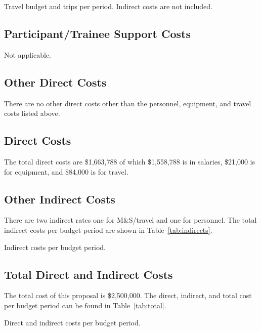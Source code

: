 \documentclass[letter, USenglish, 11pt, subfigure]{article}
\begin{document}
\begin{table}[!htpb]
  \begin{center}  
    \caption{Travel budget and trips per period. Indirect costs are not included.}
    \label{tab:yearlyTravelBudget}
  
  \end{center}
\end{table}

\subsection{Participant/Trainee Support Costs}
\label{subsec:trainee}
Not applicable.

\subsection{Other Direct Costs}
\label{subsec:otherDirects}
There are no other direct costs other than the personnel, equipment, and travel costs listed above.

\subsection{Direct Costs}
\label{subsec:directs}
The total direct costs are \$1,663,788 of which \$1,558,788 is in salaries, \$21,000 is for equipment, and \$84,000 is for travel.

\subsection{Other Indirect Costs}
\label{subsec:otherIndirects}
There are two indirect rates one for M\&S/travel and one for personnel. The total indirect costs per budget period are shown in Table~\ref{tab:indirects}.

\begin{table}[!htpb]
  \begin{center}  
    \caption{Indirect costs per budget period.}
      \label{tab:indirects}
  
  \end{center}
\end{table}

\subsection{Total Direct and Indirect Costs}
\label{subsec:totalCosts}
The total cost of this proposal is \$2,500,000. The direct, indirect, and total cost per budget period can be found in Table~\ref{tab:total}.

\begin{table}[!htpb]
  \begin{center}  
    \caption{Direct and indirect costs per budget period.}
      \label{tab:total}
  
  \end{center}
\end{table}
\clearpage


\end{document}
